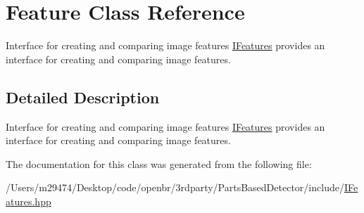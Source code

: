 \hypertarget{class_feature}{\section{Feature Class Reference}
\label{class_feature}
}


Interface for creating and comparing image features \hyperlink{class_i_features}{I\-Features} provides an interface for creating and comparing image features.  




\subsection{Detailed Description}
Interface for creating and comparing image features \hyperlink{class_i_features}{I\-Features} provides an interface for creating and comparing image features. 

The documentation for this class was generated from the following file\-:\begin{DoxyCompactItemize}
\item 
/\-Users/m29474/\-Desktop/code/openbr/3rdparty/\-Parts\-Based\-Detector/include/\hyperlink{_i_features_8hpp}{I\-Features.\-hpp}\end{DoxyCompactItemize}
